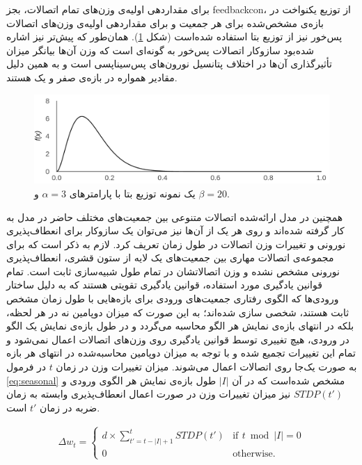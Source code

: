 \documentclass[12pt]{report}
\begin{document}
	برای مقداردهی اولیه‌ی وزن‌های تمام اتصالات، بجز \gls{feedbackcon}، از توزیع یکنواخت در بازه‌ی مشخص‌شده برای هر جمعیت و برای مقداردهی اولیه‌ی وزن‌های اتصالات پس‌خور نیز از توزیع بتا استفاده شده‌است (شکل \ref{fig:beta}). همان‌طور که پیش‌تر نیز اشاره شده‌بود سازوکار اتصالات پس‌خور به گونه‌ای است که وزن آن‌ها بیانگر میزان تأثیرگذاری آن‌ها در اختلاف پتانسیل نورون‌های پس‌سیناپسی است و به همین دلیل مقادیر همواره در بازه‌ی صفر و یک هستند.
	
	\begin{figure}[]
		\centering
		\includegraphics[width=0.8\linewidth]{beta-3-20.png}
		\caption[NS]{
			یک نمونه توزیع بتا با پارامتر‌های $\alpha=3$ و $\beta=20$.
		}
		\label{fig:beta} 
	\end{figure}
	
	همچنین در مدل ارائه‌شده اتصالات متنوعی بین جمعیت‌های مختلف حاضر در مدل به کار گرفته شده‌اند و روی هر یک از آن‌ها نیز می‌توان یک سازوکار برای انعطاف‌پذیری نورونی و تغییرات وزن اتصالات در طول زمان تعریف کرد. لازم به ذکر است که برای مجموعه‌ی اتصالات مهاری بین جمعیت‌های یک لایه از ستون قشری، انعطاف‌پذیری نورونی مشخص نشده و وزن اتصالاتشان در تمام طول شبیه‌سازی ثابت است. تمام قوانین یادگیری مورد استفاده، قوانین یادگیری تقویتی هستند که به دلیل ساختار ورودی‌ها که الگوی رفتاری جمعیت‌های ورودی برای بازه‌هایی با طول زمان مشخص ثابت هستند، شخصی سازی شده‌اند؛ به این صورت که میزان دوپامین نه در هر لحظه، بلکه در انتهای بازه‌ی نمایش هر الگو محاسبه می‌گردد و در طول بازه‌ی نمایش یک الگو در ورودی، هیچ تغییری توسط قوانین یادگیری روی وزن‌های اتصالات اعمال نمی‌شود و تمام این تغییرات تجمیع شده و  با توجه به میزان دوپامین محاسبه‌شده در انتهای هر بازه به صورت یک‌جا روی اتصالات اعمال می‌شوند. میزان تغییرات وزن در زمان $t$ در فرمول \ref{eq:seasonal} مشخص شده‌است که در آن $|I|$ طول بازه‌ی نمایش هر الگوی ورودی و $STDP(t')$ نیز میزان تغییرات وزن در صورت اعمال انعطاف‌پذیری وابسته به زمان ضربه در زمان $t'$ است.
	
	\begin{align}
		\Delta w_t =
		\begin{cases}
			d \times \sum_{t'=t-\left | I \right |+1}^{t} STDP(t') & \text{if}\,~t\bmod\left | I \right | = 0\\
			0 & \text{otherwise.}
		\end{cases}  
		\label{eq:seasonal}
	\end{align}
	
\end{document}
